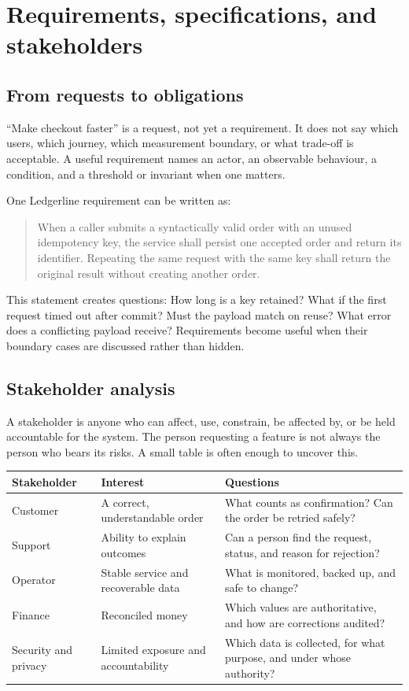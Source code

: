 \chapter{Requirements, specifications, and stakeholders}

\section{From requests to obligations}
“Make checkout faster” is a request, not yet a requirement. It does not say
which users, which journey, which measurement boundary, or what trade-off is
acceptable. A useful requirement names an actor, an observable behaviour, a
condition, and a threshold or invariant when one matters.

One Ledgerline requirement can be written as:

\begin{quote}
When a caller submits a syntactically valid order with an unused idempotency key,
the service shall persist one accepted order and return its identifier. Repeating
the same request with the same key shall return the original result without
creating another order.
\end{quote}

This statement creates questions: How long is a key retained? What if the first
request timed out after commit? Must the payload match on reuse? What error does a
conflicting payload receive? Requirements become useful when their boundary
cases are discussed rather than hidden.

\section{Stakeholder analysis}
A stakeholder is anyone who can affect, use, constrain, be affected by, or be
held accountable for the system. The person requesting a feature is not always
the person who bears its risks. A small table is often enough to uncover this.

\noindent\begin{tabularx}{\textwidth}{@{}p{}p{}X@{}}
\toprule
Stakeholder & Interest & Questions \\
\midrule
Customer & A correct, understandable order & What counts as confirmation? Can the order be retried safely? \\
Support & Ability to explain outcomes & Can a person find the request, status, and reason for rejection? \\
Operator & Stable service and recoverable data & What is monitored, backed up, and safe to change? \\
Finance & Reconciled money & Which values are authoritative, and how are corrections audited? \\
Security and privacy & Limited exposure and accountability & Which data is collected, for what purpose, and under whose authority? \\
\bottomrule
\end{tabularx}

